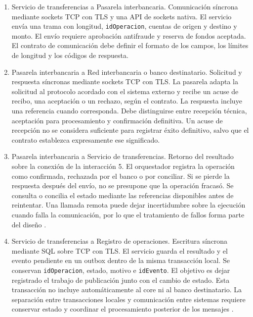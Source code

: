 \documentclass[12pt,a4paper]{article}
\begin{document}
\begin{enumerate}
    \item Servicio de transferencias a Pasarela interbancaria.
    Comunicación síncrona mediante sockets TCP con TLS y
    una API de sockets nativa. El servicio envía una trama
    con longitud, \texttt{idOperacion}, cuentas de origen y
    destino y monto. El envío requiere aprobación antifraude
    y reserva de fondos aceptada. El contrato de comunicación
    debe definir el formato de los campos, los límites de
    longitud y los códigos de respuesta.

    \item Pasarela interbancaria a Red interbancaria o banco
    destinatario.
    Solicitud y respuesta síncronas mediante sockets TCP
    con TLS. La pasarela adapta la solicitud al protocolo
    acordado con el sistema externo y recibe un acuse de
    recibo, una aceptación o un rechazo, según el contrato.
    La respuesta incluye una referencia cuando corresponda.
    Debe distinguirse entre recepción técnica, aceptación
    para procesamiento y confirmación definitiva. Un acuse
    de recepción no se considera suficiente para registrar
    éxito definitivo, salvo que el contrato establezca
    expresamente ese significado.

    \item Pasarela interbancaria a Servicio de transferencias.
    Retorno del resultado sobre la conexión de la
    interacción 5. El orquestador registra la operación
    como confirmada, rechazada por el banco o por conciliar.
    Si se pierde la respuesta después del envío, no se
    presupone que la operación fracasó. Se consulta o
    concilia el estado mediante las referencias disponibles
    antes de reintentar. Una llamada remota puede dejar
    incertidumbre sobre la ejecución cuando falla la
    comunicación, por lo que el tratamiento de fallos
    forma parte del diseño \cite{birrell1984}.

    \item Servicio de transferencias a Registro de operaciones.
    Escritura síncrona mediante SQL sobre TCP con TLS.
    El servicio guarda el resultado y el evento pendiente
    en un outbox dentro de la misma transacción local.
    Se conservan \texttt{idOperacion}, estado, motivo e
    \texttt{idEvento}. El objetivo es dejar registrado el
    trabajo de publicación junto con el cambio de estado.
    Esta transacción no incluye automáticamente al core
    ni al banco destinatario. La separación entre
    transacciones locales y comunicación entre sistemas
    requiere conservar estado y coordinar el procesamiento
    posterior de los mensajes \cite{helland2017}.


\end{enumerate}
\end{document}
